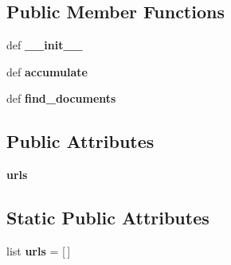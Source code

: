 \subsection*{Public Member Functions}
\begin{DoxyCompactItemize}
\item 
\hypertarget{classcheshire3_1_1web_1_1document_factory_1_1_acc_http_document_stream_af9f154ed357ca5205cf003006656fca3}{def {\bfseries \-\_\-\-\_\-init\-\_\-\-\_\-}}\label{classcheshire3_1_1web_1_1document_factory_1_1_acc_http_document_stream_af9f154ed357ca5205cf003006656fca3}

\item 
\hypertarget{classcheshire3_1_1web_1_1document_factory_1_1_acc_http_document_stream_a96dd16d26f3c3d104b25787ce64bf012}{def {\bfseries accumulate}}\label{classcheshire3_1_1web_1_1document_factory_1_1_acc_http_document_stream_a96dd16d26f3c3d104b25787ce64bf012}

\item 
\hypertarget{classcheshire3_1_1web_1_1document_factory_1_1_acc_http_document_stream_aa98edd47ca8ac11b37bf4269df5eed4f}{def {\bfseries find\-\_\-documents}}\label{classcheshire3_1_1web_1_1document_factory_1_1_acc_http_document_stream_aa98edd47ca8ac11b37bf4269df5eed4f}

\end{DoxyCompactItemize}
\subsection*{Public Attributes}
\begin{DoxyCompactItemize}
\item 
\hypertarget{classcheshire3_1_1web_1_1document_factory_1_1_acc_http_document_stream_a18eb45402a03c54baff17423dbd38de5}{{\bfseries urls}}\label{classcheshire3_1_1web_1_1document_factory_1_1_acc_http_document_stream_a18eb45402a03c54baff17423dbd38de5}

\end{DoxyCompactItemize}
\subsection*{Static Public Attributes}
\begin{DoxyCompactItemize}
\item 
\hypertarget{classcheshire3_1_1web_1_1document_factory_1_1_acc_http_document_stream_a5551dcb09e7acee8b4028f285eb3ab1d}{list {\bfseries urls} = \mbox{[}$\,$\mbox{]}}\label{classcheshire3_1_1web_1_1document_factory_1_1_acc_http_document_stream_a5551dcb09e7acee8b4028f285eb3ab1d}

\end{DoxyCompactItemize}


